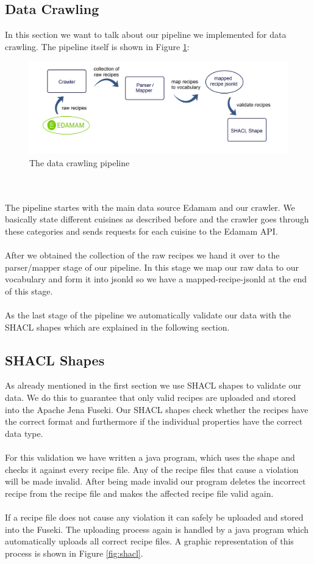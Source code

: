 \documentclass{article}
\begin{document}
\subsection{Data Crawling}
In this section we want to talk about our pipeline we implemented for data crawling. The pipeline itself is shown in Figure \ref{fig:pipe}:

\begin{figure}[H]
  \centering
  \includegraphics[width=12cm]{pictures/pipeline.png}
  \caption{The data crawling pipeline}
  \label{fig:pipe}
\end{figure}
\noindent
\\ \\
The pipeline startes with the main data source Edamam and our crawler. We basically state different cuisines as described before and the crawler goes through these categories and sends requests for each cuisine to the Edamam API. \\ \\
After we obtained the collection of the raw recipes we hand it over to the parser/mapper stage of our pipeline. In this stage we map our raw data to our vocabulary and form it into jsonld so we have a mapped-recipe-jsonld at the end of this stage. \\ \\
As the last stage of the pipeline we automatically validate our data with the SHACL shapes which are explained in the following section.

\subsection{SHACL Shapes}
As already mentioned in the first section we use SHACL shapes to validate our data. We do this to guarantee that only valid recipes are uploaded and stored into the Apache Jena Fuseki. Our SHACL shapes check whether the recipes have the correct format and furthermore if the individual properties have the correct data type. \\ \\
For this validation we have written a java program, which uses the shape and checks it against every recipe file. Any of the recipe files that cause a violation will be made invalid. After being made invalid our program deletes the incorrect recipe from the recipe file and makes the affected recipe file valid again. \\ \\
If a recipe file does not cause any violation it can safely be uploaded and stored into the Fuseki. The uploading process again is handled by a java program which automatically uploads all correct recipe files. A graphic representation of this process is shown in Figure \ref{fig:shacl}.
\end{document}
